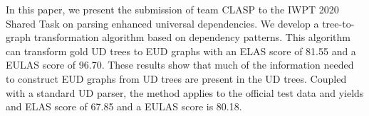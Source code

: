 In this paper, we present the submission of team CLASP to the IWPT 2020 Shared Task on parsing enhanced universal dependencies. We develop a tree-to-graph transformation algorithm based on dependency patterns. This algorithm can transform gold UD trees to EUD graphs with an ELAS score of 81.55 and a EULAS score of 96.70.  These results show that much of the information needed to construct EUD graphs from UD trees are present in the UD trees. Coupled with a standard UD parser, the method applies to the official test data and yields and ELAS score of 67.85 and a EULAS score is 80.18.
